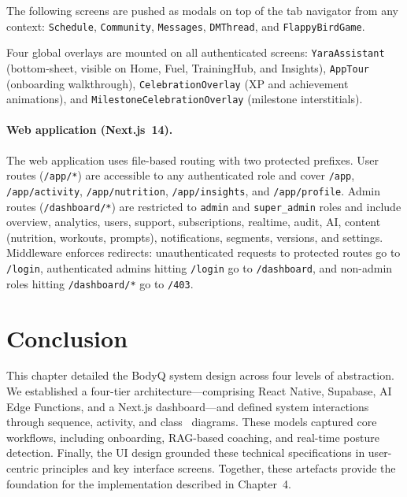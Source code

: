 The following screens are pushed as modals on top of the tab navigator
from any context: \texttt{Schedule}, \texttt{Community},
\texttt{Messages}, \texttt{DMThread}, and \texttt{FlappyBirdGame}.

Four global overlays are mounted on all authenticated screens:
\texttt{YaraAssistant} (bottom-sheet, visible on Home, Fuel,
TrainingHub, and Insights), \texttt{AppTour} (onboarding walkthrough),
\texttt{CelebrationOverlay} (XP and achievement animations), and
\texttt{MilestoneCelebrationOverlay} (milestone interstitials).

\paragraph{Web application (Next.js~14).}
The web application uses file-based routing with two protected prefixes.
User routes (\texttt{/app/*}) are accessible to any authenticated role
and cover \texttt{/app}, \texttt{/app/activity},
\texttt{/app/nutrition}, \texttt{/app/insights}, and
\texttt{/app/profile}. Admin routes (\texttt{/dashboard/*}) are
restricted to \texttt{admin} and \texttt{super\_admin} roles and
include overview, analytics, users, support, subscriptions, realtime,
audit, AI, content (nutrition, workouts, prompts), notifications,
segments, versions, and settings. Middleware enforces redirects:
unauthenticated requests to protected routes go to \texttt{/login},
authenticated admins hitting \texttt{/login} go to
\texttt{/dashboard}, and non-admin roles hitting \texttt{/dashboard/*}
go to \texttt{/403}.

\section{Conclusion}

This chapter detailed the BodyQ system design across four levels of abstraction. We established a four-tier architecture—comprising React Native, Supabase, AI Edge Functions, and a Next.js dashboard—and defined system interactions through sequence, activity, and class~ diagrams. These models captured core workflows, including onboarding, RAG-based coaching, and real-time posture detection. Finally, the UI design grounded these technical specifications in user-centric principles and key interface screens. Together, these artefacts provide the foundation for the implementation described in Chapter~4.
